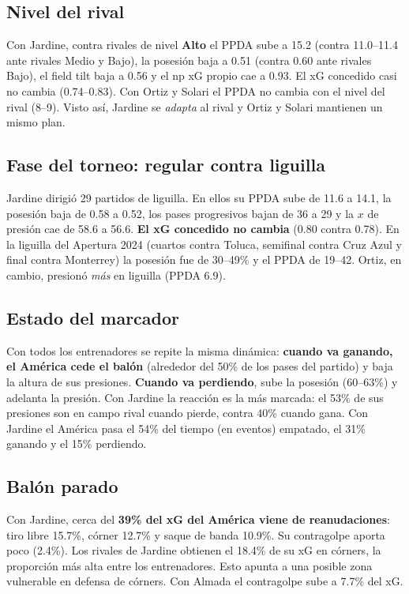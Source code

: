 \documentclass[11pt,a4paper]{article}
\begin{document}
\subsection{Nivel del rival}


\begin{historia}
Con Jardine, contra rivales de nivel \textbf{Alto} el PPDA sube a 15.2 (contra 11.0--11.4 ante rivales Medio y Bajo), la posesión baja a 0.51 (contra 0.60 ante rivales Bajo), el field tilt baja a 0.56 y el np xG propio cae a 0.93. El xG concedido casi no cambia (0.74--0.83). Con Ortiz y Solari el PPDA no cambia con el nivel del rival (8--9). Visto así, Jardine se \emph{adapta} al rival y Ortiz y Solari mantienen un mismo plan.
\end{historia}

\subsection{Fase del torneo: regular contra liguilla}\label{sec:fase}

Jardine dirigió 29 partidos de liguilla. En ellos su PPDA sube de 11.6 a 14.1, la posesión baja de 0.58 a 0.52, los pases progresivos bajan de 36 a 29 y la $x$ de presión cae de 58.6 a 56.6. \textbf{El xG concedido no cambia} (0.80 contra 0.78). En la liguilla del Apertura 2024 (cuartos contra Toluca, semifinal contra Cruz Azul y final contra Monterrey) la posesión fue de 30--49\% y el PPDA de 19--42. Ortiz, en cambio, presionó \emph{más} en liguilla (PPDA 6.9).

\subsection{Estado del marcador}

Con todos los entrenadores se repite la misma dinámica: \textbf{cuando va ganando, el América cede el balón} (alrededor del 50\% de los pases del partido) y baja la altura de sus presiones. \textbf{Cuando va perdiendo}, sube la posesión (60--63\%) y adelanta la presión. Con Jardine la reacción es la más marcada: el 53\% de sus presiones son en campo rival cuando pierde, contra 40\% cuando gana. Con Jardine el América pasa el 54\% del tiempo (en eventos) empatado, el 31\% ganando y el 15\% perdiendo.

\subsection{Balón parado}

Con Jardine, cerca del \textbf{39\% del xG del América viene de reanudaciones}: tiro libre 15.7\%, córner 12.7\% y saque de banda 10.9\%. Su contragolpe aporta poco (2.4\%). Los rivales de Jardine obtienen el 18.4\% de su xG en córners, la proporción más alta entre los entrenadores. Esto apunta a una posible zona vulnerable en defensa de córners. Con Almada el contragolpe sube a 7.7\% del xG.
\end{document}
